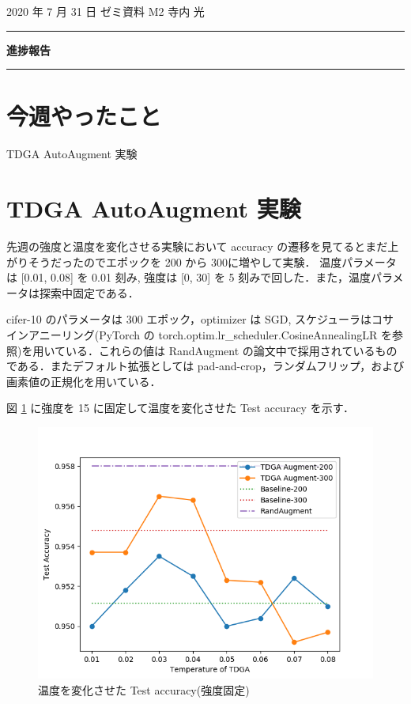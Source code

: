 \documentclass[onecolumn]{ujarticle}   %
\begin{document}
	\noindent

	\hspace{1em}
	2020 年 7 月 31 日
	ゼミ資料
	\hfill
	M2 寺内 光

	\vspace{2mm}

	\hrule

	\begin{center}
		{\Large \bf 進捗報告}
	\end{center}

	\hrule
	\vspace{3mm}

	\section{今週やったこと}
	\begin{itemize}{
    \item{TDGA AutoAugment 実験}
	}\end{itemize}

  \section{TDGA AutoAugment 実験}
  先週の強度と温度を変化させる実験において accuracy の遷移を見てるとまだ上がりそうだったのでエポックを 200 から 300に増やして実験．
  温度パラメータは [0.01, 0.08] を 0.01 刻み, 強度は [0, 30] を 5 刻みで回した．また，温度パラメータは探索中固定である．

  cifer-10 のパラメータは 300 エポック，optimizer は SGD, スケジューラはコサインアニーリング(PyTorch の torch.optim.lr\_scheduler.CosineAnnealingLR を参照)を用いている．これらの値は RandAugment の論文中で採用されているものである．またデフォルト拡張としては pad-and-crop，ランダムフリップ，および画素値の正規化を用いている．

  図 \ref{fig:exp_change_temperature} に強度を 15 に固定して温度を変化させた Test accuracy を示す．
  \begin{figure}[ht]
    \begin{center}
      \includegraphics[width=0.7\columnwidth]{exp_change_temperature.png}
      \caption{温度を変化させた Test accuracy(強度固定)}
      \label{fig:exp_change_temperature}
    \end{center}
  \end{figure}
\end{document}
